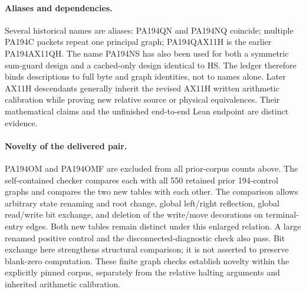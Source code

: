 \paragraph{Aliases and dependencies.}
Several historical names are aliases: PA194QN and PA194NQ coincide;
multiple PA194C packets repeat one principal graph; PA194QAX11H is the
earlier PA194AX11QH. The name PA194NS has also been used for both a
symmetric sum-guard design and a cached-only design identical to HS.
The ledger therefore binds descriptions to full byte and graph identities,
not to names alone. Later AX11H descendants generally inherit the revised
AX11H written arithmetic calibration while proving new relative source
or physical equivalences. Their mathematical claims and the unfinished
end-to-end Lean endpoint are distinct evidence.

\paragraph{Novelty of the delivered pair.}
PA194OM and PA194OMF are excluded from all prior-corpus counts above.
The self-contained checker compares each with all 550 retained prior
194-control graphs and compares the two new tables with each other.
The comparison allows arbitrary state renaming and root change, global
left/right reflection, global read/write bit exchange, and deletion of
the write/move decorations on terminal-entry edges. Both new tables
remain distinct under this enlarged relation. A large renamed positive
control and the disconnected-diagnostic check also pass.
Bit exchange here strengthens structural comparison; it is not asserted
to preserve blank-zero computation. These finite graph checks establish
novelty within the explicitly pinned corpus, separately from the relative
halting arguments and inherited arithmetic calibration.

